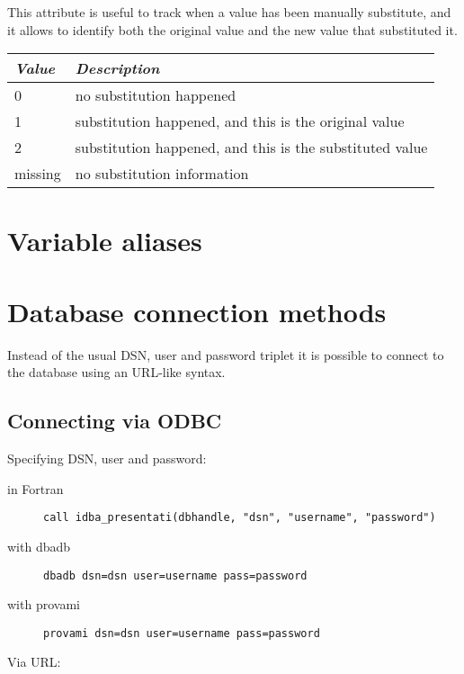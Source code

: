 \documentclass[final,12pt,a4paper,twoside]{book}
\begin{document}
This attribute is useful to track when a value has been manually substitute,
and it allows to identify both the original value and the new value that
substituted it.

\begin{tabular}{|l|l|}
\hline
{\em Value} & {\em Description}               \\
\hline
          0 & no substitution happened                                 \\
          1 & substitution happened, and this is the original value    \\
          2 & substitution happened, and this is the substituted value \\
    missing & no substitution information                              \\
\hline
\end{tabular}


\chapter{Variable aliases}

\label{aliastable}


\chapter{Database connection methods}

\label{dburls}

Instead of the usual DSN, user and password triplet it is possible to connect
to the database using an URL-like syntax.

\section{Connecting via ODBC}

Specifying DSN, user and password:

\begin{description}
\item[in Fortran]
  {\tt call idba\_presentati(dbhandle, "dsn", "username", "password")}
\item[with dbadb]
  {\tt dbadb \-\-dsn=dsn \-\-user=username \-\-pass=password}
\item[with provami]
  {\tt provami \-\-dsn=dsn \-\-user=username \-\-pass=password}
\end{description}

Via URL:
\end{document}
